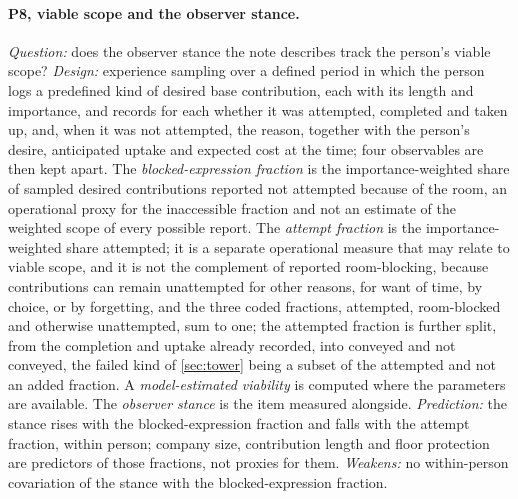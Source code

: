 \paragraph{P8, viable scope and the observer stance.} \emph{Question:} does the observer stance the note describes track the person's viable scope? \emph{Design:} experience sampling over a defined period in which the person logs a predefined kind of desired base contribution, each with its length and importance, and records for each whether it was attempted, completed and taken up, and, when it was not attempted, the reason, together with the person's desire, anticipated uptake and expected cost at the time; four observables are then kept apart. The \emph{blocked-expression fraction} is the importance-weighted share of sampled desired contributions reported not attempted because of the room, an operational proxy for the inaccessible fraction and not an estimate of the weighted scope of every possible report. The \emph{attempt fraction} is the importance-weighted share attempted; it is a separate operational measure that may relate to viable scope, and it is not the complement of reported room-blocking, because contributions can remain unattempted for other reasons, for want of time, by choice, or by forgetting, and the three coded fractions, attempted, room-blocked and otherwise unattempted, sum to one; the attempted fraction is further split, from the completion and uptake already recorded, into conveyed and not conveyed, the failed kind of \autoref{sec:tower} being a subset of the attempted and not an added fraction. A \emph{model-estimated viability} is computed where the parameters are available. The \emph{observer stance} is the item measured alongside. \emph{Prediction:} the stance rises with the blocked-expression fraction and falls with the attempt fraction, within person; company size, contribution length and floor protection are predictors of those fractions, not proxies for them. \emph{Weakens:} no within-person covariation of the stance with the blocked-expression fraction.
